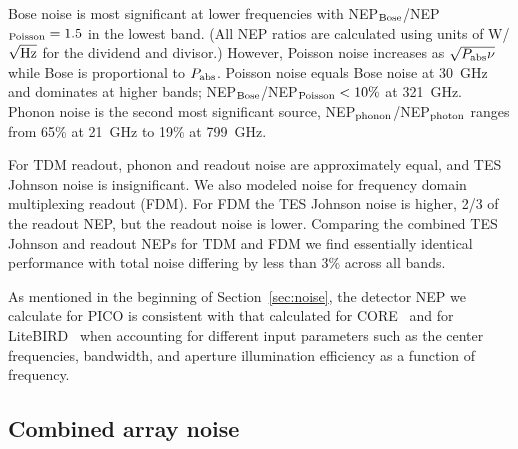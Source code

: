 \documentclass[]{spie}  %
\newcommand{\comr}[1]{\textcolor{red}{#1}}
\newcommand{\como}[1]{\textcolor{orange}{#1}}
\begin{document}
Bose noise is most significant 
at lower frequencies with NEP$_{\rm Bose}$/NEP$_{\rm Poisson}= 1.5 $ in the lowest band. (All NEP ratios are calculated using 
units of W/$\sqrt{\rm Hz}$ for the dividend and divisor.)  However, Poisson noise increases as 
$\sqrt{P_{\rm abs}\nu}$ while Bose is proportional to $P_{\rm abs}$. Poisson noise equals Bose noise at 30~GHz and 
dominates at higher bands; NEP$_{\rm Bose}$/NEP$_{\rm Poisson} <10\%$ at 321~GHz. 
Phonon noise is the second most significant source, NEP$_{\rm phonon}$/NEP$_{\rm photon}$ ranges from 65\% at 21~GHz 
to 19\% at 799~GHz. 

For TDM readout, phonon and readout noise are approximately equal, and TES Johnson noise is insignificant.  We also modeled 
noise for frequency domain multiplexing readout (FDM).  For FDM the TES Johnson noise is higher, 2/3 of the readout NEP, but the readout 
noise is lower.  Comparing the combined TES Johnson and readout NEPs for TDM and FDM we find essentially identical performance 
with total noise differing by less than 3\% across all bands.  


As mentioned in the beginning of Section~\ref{sec:noise}, the detector NEP we calculate for PICO is consistent with 
that calculated for CORE~\cite{core} 
and for LiteBIRD~\cite{litebird, suzuki_private} when accounting for different input parameters such as the center frequencies, bandwidth,  
and aperture illumination efficiency as a function of frequency. 

\subsection{Combined  array noise}
\end{document}
